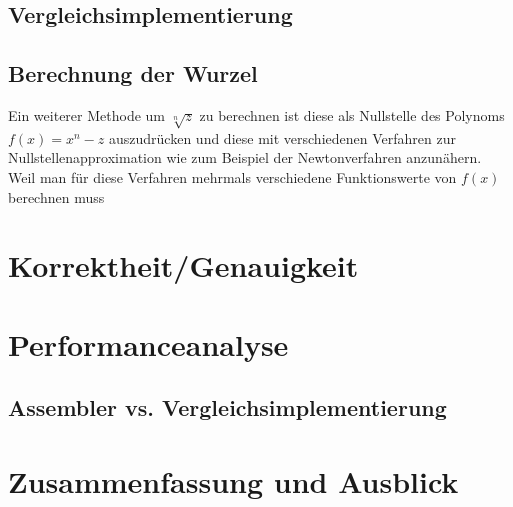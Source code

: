 \documentclass[course=erap]{aspdoc}
\begin{document}
\subsection{Vergleichsimplementierung}
\subsection{Berechnung der Wurzel}
Ein weiterer Methode um $\sqrt[n]{z}$ zu berechnen ist diese als Nullstelle des Polynoms $f(x)=x^n-z$ auszudrücken und diese mit verschiedenen Verfahren zur Nullstellenapproximation wie zum Beispiel der Newtonverfahren anzunähern. Weil man für diese Verfahren mehrmals verschiedene Funktionswerte von $f(x)$ berechnen muss    


\section{Korrektheit/Genauigkeit}


\section{Performanceanalyse}
\subsection{Assembler vs. Vergleichsimplementierung}


\section{Zusammenfassung und Ausblick}


{}
\end{document}

